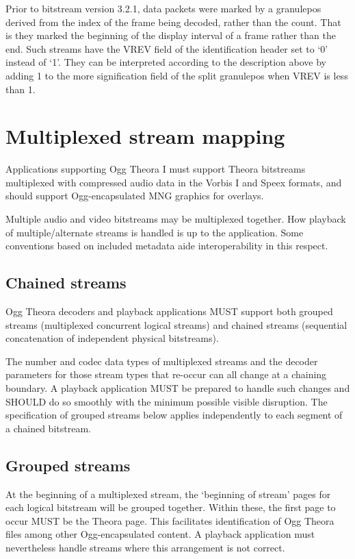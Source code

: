 \documentclass[9pt,letterpaper]{book}
\numberwithin{equation}{chapter}
\numberwithin{figure}{chapter}
\numberwithin{table}{chapter}
\begin{document}
Prior to bitstream version 3.2.1, data packets were marked by a 
granulepos derived from the index of the frame being decoded,
rather than the count. That is they marked the beginning of the
display interval of a frame rather than the end. Such streams
have the VREV field of the identification header set to `0' 
instead of `1'. They can be interpreted according to the description
above by adding 1 to the more signification field of the split 
granulepos when VREV is less than 1.

\section{Multiplexed stream mapping}

Applications supporting Ogg Theora I must support Theora bitstreams
 multiplexed with compressed audio data in the Vorbis I and Speex
 formats, and should support Ogg-encapsulated MNG graphics for overlays.

Multiple audio and video bitstreams may be multiplexed together.
How playback of multiple/alternate streams is handled is up to the
 application.
Some conventions based on included metadata aide interoperability
 in this respect.

\subsection{Chained streams}

Ogg Theora decoders and playback applications MUST support both grouped
 streams (multiplexed concurrent logical streams) and chained streams
 (sequential concatenation of independent physical bitstreams).

The number and codec data types of multiplexed streams and the decoder
 parameters for those stream types that re-occur can all change at a
 chaining boundary.
A playback application MUST be prepared to handle such changes and
 SHOULD do so smoothly with the minimum possible visible disruption.
The specification of grouped streams below applies independently to each
 segment of a chained bitstream.

\subsection{Grouped streams}

At the beginning of a multiplexed stream, the `beginning of stream'
 pages for each logical bitstream will be grouped together.
Within these, the first page to occur MUST be the Theora page.
This facilitates identification of Ogg Theora files among other
 Ogg-encapsulated content.
A playback application must nevertheless handle streams where this
 arrangement is not correct.
\end{document}
